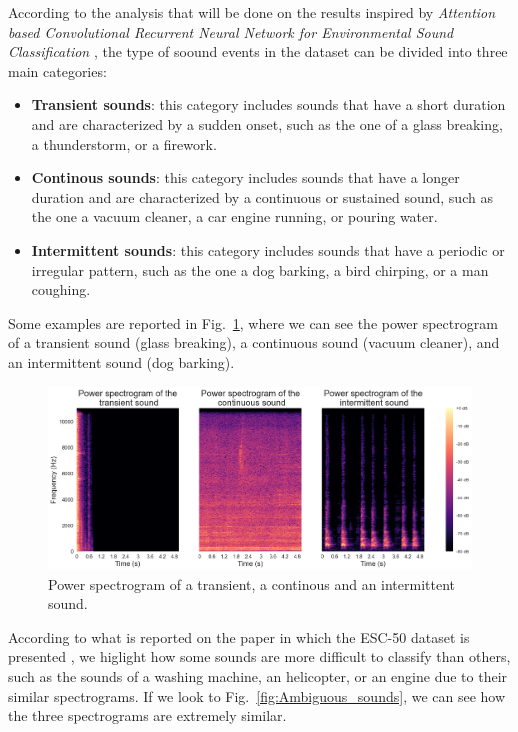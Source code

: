 \documentclass{article}
\begin{document}
\begin{sloppy}
According to the analysis that will be done on the results inspired by \textit{Attention based Convolutional Recurrent Neural Network for Environmental Sound Classification} \cite{zhang2019attentionbasedconvolutionalrecurrent}, the type of soound events in the dataset can be divided into three main categories:
\begin{itemize}
    \item \textbf{Transient sounds}: this category includes sounds that have a short duration and are characterized by a sudden onset, such as the one of a glass breaking, a thunderstorm, or a firework.
    \item \textbf{Continous sounds}: this category includes sounds that have a longer duration and are characterized by a continuous or sustained sound, such as the one a vacuum cleaner, a car engine running, or pouring water.
    \item \textbf{Intermittent sounds}: this category includes sounds that have a periodic or irregular pattern, such as the one a dog barking, a bird chirping, or a man coughing.
\end{itemize}
Some examples are reported in Fig.~\ref{fig:power_spectrograms_3_sounds}, where we can see the power spectrogram of a transient sound (glass breaking), a continuous sound (vacuum cleaner), and an intermittent sound (dog barking).

\begin{figure}[ht]
  \centering
  \centerline{\includegraphics[width=\columnwidth]{Three_types_of_sound.png}}
  \caption{Power spectrogram of a transient, a continous and an intermittent sound.}
  \label{fig:power_spectrograms_3_sounds}
\end{figure}

According to what is reported on the paper in which the ESC-50 dataset is presented \cite{piczak2015dataset}, we higlight how some sounds are more difficult to classify than others,
such as the sounds of a washing machine, an helicopter, or an engine due to their similar spectrograms. If we look to Fig.~\ref{fig:Ambiguous_sounds}, we can see how the three spectrograms
are extremely similar.


\end{sloppy}
\end{document}
